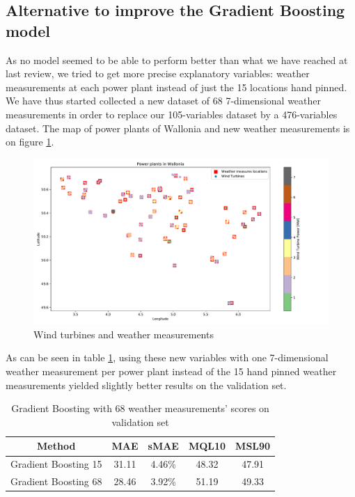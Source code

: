 \documentclass[a4paper, 12pt]{article}
\begin{document}
\subsection{Alternative to improve the Gradient Boosting model}

As no model seemed to be able to perform better than what we have reached at last review, we tried to get more precise explanatory variables: weather measurements at each power plant instead of just the 15 locations hand pinned. We have thus started collected a new dataset of 68 7-dimensional weather measurements in order to replace our 105-variables dataset by a 476-variables dataset. The map of power plants of Wallonia and new weather measurements is on figure \ref{fig:wt_wallonia}.

\begin{figure}[H]
    \centering
    \includegraphics[width=\textwidth]{resources/pdf/power_plants.pdf}
    \caption{Wind turbines and weather measurements}
    \label{fig:wt_wallonia}
\end{figure}

As can be seen in table \ref{tab:wind68}, using these new variables with one 7-dimensional weather measurement per power plant instead of the 15 hand pinned weather measurements yielded slightly better results on the validation set.

\begin{table}[H]
    \centering
    \begin{tabular}{|c|c|c|c|c|}
        \hline
        Method & MAE & sMAE & MQL10 & MSL90 \\ \hline
        Gradient Boosting 15 & 31.11 & 4.46\% & 48.32 & 47.91 \\ \hline
        Gradient Boosting 68 & 28.46 & 3.92\% & 51.19 & 49.33 \\ \hline
    \end{tabular}
    \caption{Gradient Boosting with 68 weather measurements' scores on validation set}
    \label{tab:wind68}
\end{table}
\end{document}
